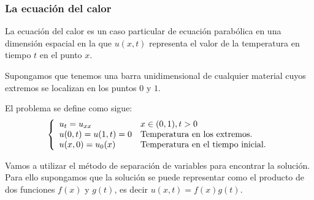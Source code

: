 \subsubsection{La ecuación del calor}
La ecuación del calor es un caso particular de ecuación parabólica en una dimensión espacial en la que $u(x,t)$ representa el valor de la temperatura en tiempo $t$ en el punto $x$.

Supongamos que tenemos una barra unidimensional de cualquier material cuyos extremos se localizan en los puntos $0$ y $1$.

El problema se define como sigue:
\begin{equation*}
	\left\{
	\begin{array}{l l l}
		u_t = u_{xx} & x\in(0,1), t>0\\
		u(0,t) = u(1,t) = 0 & \text{Temperatura en los extremos.}\\
		u(x,0) = u_0(x) & \text{Temperatura en el tiempo inicial.}\\
	\end{array}
	\right.
\end{equation*}

Vamos a utilizar el método de separación de variables para encontrar la solución. Para ello supongamos que la solución se puede representar como el producto de dos funciones $f(x)$ y $g(t)$, es decir $u(x,t) = f(x)g(t)$.

